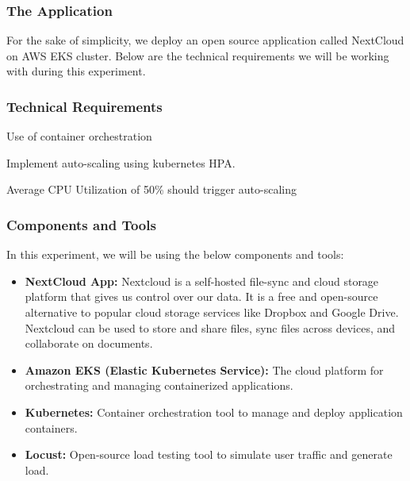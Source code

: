 \documentclass{article}
\begin{document}
\subsubsection{The Application}
For the sake of simplicity, we deploy an open source application called NextCloud on AWS EKS cluster.
Below are the technical requirements we will be working with during this experiment.
\subsubsection{Technical Requirements}
\begin{enumerate}[label=\textbf{[TR\arabic*]}, leftmargin=4\parindent]
        \item Use of container orchestration
        \item Implement auto-scaling using kubernetes HPA.
        \item Average CPU Utilization of 50\% should trigger auto-scaling
\end{enumerate}
\subsubsection{Components and Tools}
In this experiment, we will be using the below components and tools:
\begin{itemize}
    \item \textbf{NextCloud App: } Nextcloud is a self-hosted file-sync and cloud storage platform that gives us control over our data. It is a free and open-source alternative to popular cloud storage services like Dropbox and Google Drive. Nextcloud can be used to store and share files, sync files across devices, and collaborate on documents. \cite{nextcloud}
    \item \textbf{Amazon EKS (Elastic Kubernetes Service): } The cloud platform for orchestrating and managing containerized applications.
    \item \textbf{Kubernetes: }Container orchestration tool to manage and deploy application containers.
    \item \textbf{Locust: } Open-source load testing tool to simulate user traffic and generate load.
\end{itemize}
\end{document}
